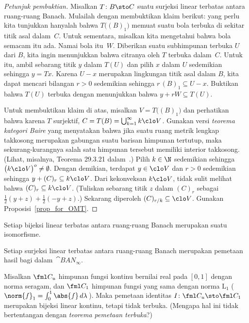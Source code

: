 \begin{proof}[\emph{Petunjuk pembuktian}] Misalkan $T\colon B \sto C$ suatu surjeksi linear terbatas antara ruang-ruang Banach.
Mulailah dengan membuktikan klaim berikut: yang perlu kita tunjukkan hanyalah bahwa $T\bigl((B)_1\bigr)$ memuat suatu bola terbuka di sekitar
titik asal dalam~$C$.  Untuk sementara, misalkan kita mengetahui bahwa bola semacam itu ada.  Namai bola itu~$W$.  Diberikan suatu subhimpunan terbuka $U$ dari $B$, kita
ingin menunjukkan bahwa citranya oleh $T$ terbuka dalam~$C$.  Untuk itu, ambil sebarang titik $y$ dalam $T(U)$ dan pilih $x$
dalam $U$ sedemikian sehingga $y = Tx$.  Karena $U - x$ merupakan lingkungan titik asal dalam $B$, kita dapat mencari bilangan $r > 0$ sedemikian sehingga
$r\,(B)_1 \subseteq U - x$.  Buktikan bahwa $T(U)$ terbuka dengan menunjukkan bahwa $y + rW \subseteq T(U)$.

Untuk membuktikan klaim di atas, misalkan $V = T\bigl((B)_1\bigr)$ dan perhatikan bahwa karena $T$ surjektif, $C = T(B) =
\bigcup_{k=1}^\infty k\clo V$.  Gunakan versi \emph{teorema kategori Baire} yang menyatakan bahwa jika suatu ruang metrik lengkap takkosong
merupakan gabungan suatu barisan himpunan tertutup, maka sekurang-kurangnya salah satu himpunan tersebut memiliki interior takkosong.
(Lihat, misalnya, Teorema 29.3.21 dalam~\cite{Erdman:2007}.)  Pilih $k \in \N$ sedemikian sehingga $\bigl(k\clo V\bigr)^o \neq \emptyset$.
Dengan demikian, terdapat $y \in \clo V$ dan $r > 0$ sedemikian sehingga $y + (C)_r \subseteq k\clo V$.  Dari kekonveksan
$k\clo V$, tidak sulit melihat bahwa $(C)_r \subseteq k\clo V$.  (Tuliskan sebarang titik $z$ dalam $(C)_r$ sebagai
$\frac12(y + z) + \frac12(-y + z)$.) Sekarang diperoleh $(C)_{r/k} \subseteq \clo V$.  Gunakan Proposisi~\ref{prop_for_OMT}.
\ns \end{proof}

\begin{cor}\label{C069417} Setiap bijeksi linear terbatas antara ruang-ruang Banach merupakan suatu
isomorfisme.
\end{cor}

\begin{cor} Setiap surjeksi linear terbatas antara ruang-ruang Banach
merupakan pemetaan hasil bagi dalam~$\cat{BAN_\infty}$.
\end{cor}

\begin{exam} Misalkan $\fml C_u$ himpunan fungsi kontinu bernilai real pada $[0,1]$ dengan
norma seragam, dan $\fml C_1$ himpunan fungsi yang sama dengan norma $\mathrm{L_1}$
(\,$\norm{f}_1 = \int_0^1\abs{f}\,d\lambda$\,). Maka pemetaan identitas $I\colon \fml C_u
\sto \fml C_1$ merupakan bijeksi linear kontinu, tetapi tidak terbuka. (Mengapa hal ini tidak
bertentangan dengan \emph{teorema pemetaan terbuka}?)
\end{exam}

